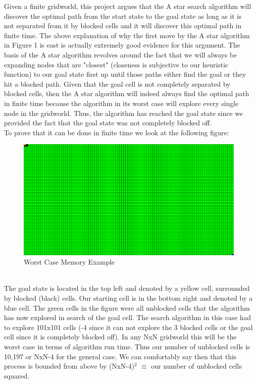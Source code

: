 \documentclass[12pt]{article}
\newcommand\tab[1][1cm]{\hspace*{#1}}
\begin{document}
\tab Given a finite gridworld, this project argues that the A star search algorithm will discover the optimal path from the start state to the goal state as long as it is not separated from it by blocked cells and it will discover this optimal path in finite time. The above explanation of why the first move by the A star algorithm in Figure 1 is east is actually extremely good evidence for this argument. The basis of the A star algorithm revolves around the fact that we will always be expanding nodes that are "closest" (closeness is subjective to our heuristic function) to our goal state first up until those paths either find the goal or they hit a blocked path. Given that the goal cell is not completely separated by blocked cells, then the A star algorithm will indeed always find the optimal path in finite time because the algorithm in its worst case will explore every single node in the gridworld. Thus, the algorithm has reached the goal state since we provided the fact that the goal state was not completely blocked off. \\ 
To prove that it can be done in finite time we look at the following figure:
	\begin{figure}[!htb]
		\centering
		\includegraphics[width=.8\textwidth]{worst_case.png}
		\caption{\label{: }Worst Case Memory Example}
	\end{figure}\\
\tab The goal state is located in the top left and denoted by a yellow cell, surrounded by blocked (black) cells. Our starting cell is in the bottom right and denoted by a blue cell. The green cells in the figure were all unblocked cells that the algorithm has now explored in search of the goal cell. The search algorithm in this case had to explore 101x101 cells (-4 since it can not explore the 3 blocked cells or the goal cell since it is completely blocked off). In any NxN gridworld this will be the worst case in terms of algorithm run time. Thus our number of unblocked cells is 10,197 or NxN-4 for the general case. We can comfortably say then that this process is bounded from above by (NxN-4)$^2$ $\equiv$ our number of unblocked cells squared.\newpage
\end{document}

